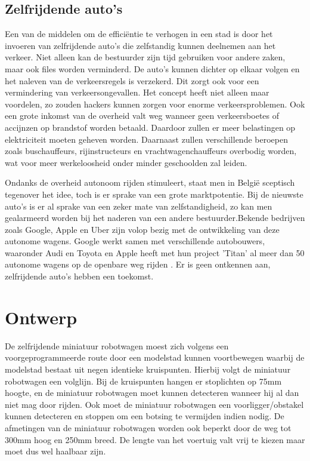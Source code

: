 \documentclass[a4paper,kulak]{kulakarticle}
\begin{document}
\subsection{Zelfrijdende auto's}

Een van de middelen om de efficiëntie te verhogen in een stad is door het invoeren van zelfrijdende auto's die zelfstandig kunnen deelnemen aan het verkeer. Niet alleen kan de bestuurder zijn tijd gebruiken voor andere zaken, maar ook files worden verminderd. De auto's kunnen dichter op elkaar volgen en het naleven van de verkeersregels is verzekerd. Dit zorgt ook voor een vermindering van verkeersongevallen. Het concept heeft niet alleen maar voordelen, zo zouden hackers kunnen zorgen voor enorme verkeersproblemen. Ook een grote inkomst van de overheid valt weg wanneer geen verkeersboetes of accijnzen op brandstof worden betaald. Daardoor zullen er meer belastingen op elektriciteit moeten geheven worden. Daarnaast zullen verschillende beroepen zoals buschauffeurs, rijinstructeurs en vrachtwagenchauffeurs overbodig worden, wat voor meer werkeloosheid onder minder geschoolden zal leiden\cite{procontracars}.

Ondanks de overheid autonoom rijden stimuleert, staat men in België sceptisch tegenover het idee, toch is er sprake van een grote marktpotentie. Bij de nieuwste auto's is er al sprake van een zeker mate van zelfstandigheid, zo kan men gealarmeerd worden bij het naderen van een andere bestuurder.Bekende bedrijven zoals Google, Apple en Uber zijn volop bezig met de ontwikkeling van deze autonome wagens. Google werkt samen met verschillende autobouwers, waaronder Audi en Toyota en Apple heeft met hun project 'Titan' al meer dan 50 autonome wagens op de openbare weg rijden \cite{bedrijven}. Er is geen ontkennen aan, zelfrijdende auto's hebben een toekomst.

\section{Ontwerp}
De zelfrijdende miniatuur robotwagen moest zich volgens een voorgeprogrammeerde route door een modelstad kunnen voortbewegen waarbij de modelstad bestaat uit negen identieke kruispunten. Hierbij volgt de miniatuur robotwagen een volglijn. Bij de kruispunten hangen er stoplichten op 75mm hoogte, en de miniatuur robotwagen moet kunnen detecteren wanneer hij al dan niet mag door rijden. Ook moet de miniatuur robotwagen een voorligger/obstakel kunnen detecteren en stoppen om een botsing te vermijden indien nodig. De afmetingen van de miniatuur robotwagen worden ook beperkt door de weg tot 300mm hoog en 250mm breed. De lengte van het voertuig valt vrij te kiezen maar moet dus wel haalbaar zijn. 
\end{document}
